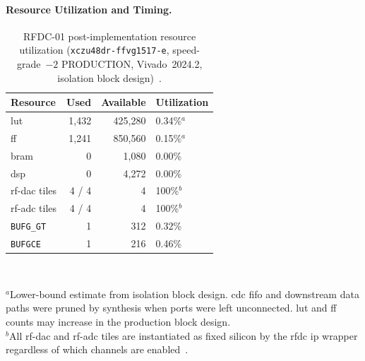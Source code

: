 \paragraph{Resource Utilization and Timing.}
\leavevmode\par
\begin{table}[!h]
  \caption{RFDC-01 post-implementation resource utilization
           (\texttt{xczu48dr\allowbreak-ffvg1517\allowbreak-e}, speed-grade~$-2$
           PRODUCTION, Vivado~2024.2, isolation block
           design)~\cite{AMD_PG269}.}
  \label{tab:rfdc01_resources}
  \centering
  \begin{tabular}{lrrl}
    \hline
    Resource                    & Used    & Available & Utilization \\
    \hline
    \ac{lut}                    & 1{,}432 & 425{,}280 & 0.34\%$^{a}$  \\[2pt]
    \ac{ff}                     & 1{,}241 & 850{,}560 & 0.15\%$^{a}$  \\[2pt]
    \ac{bram}                   &       0 & 1{,}080   & 0.00\%        \\[2pt]
    \ac{dsp}                    &       0 & 4{,}272   & 0.00\%        \\[2pt]
    \ac{rf}-\ac{dac} tiles      &  4 / 4  & 4         & 100\%$^{b}$   \\[2pt]
    \ac{rf}-\ac{adc} tiles      &  4 / 4  & 4         & 100\%$^{b}$   \\[2pt]
    \texttt{BUFG\_GT}           &       1 & 312       & 0.32\%        \\[2pt]
    \texttt{BUFGCE}             &       1 & 216       & 0.46\%        \\
    \hline
  \end{tabular}\\[4pt]
  \begin{minipage}{\linewidth}
    \small
    $^{a}$Lower-bound estimate from isolation block design.
    \ac{cdc} \ac{fifo} and downstream data paths were pruned by
    synthesis when ports were left unconnected.
    \ac{lut} and \ac{ff} counts may increase in the production
    block design.\\[3pt]
    $^{b}$All \ac{rf}-\ac{dac} and \ac{rf}-\ac{adc} tiles are
    instantiated as fixed silicon by the \ac{rfdc} \ac{ip} wrapper
    regardless of which channels are enabled~\cite{AMD_PG269}.
  \end{minipage}
\end{table}

